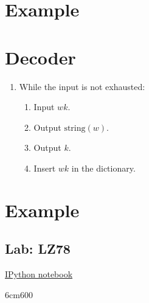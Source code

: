 \section{Example}
\section{Decoder}

\begin{enumerate}
\tightlist
\item
  While the input is not exhausted:
  \begin{enumerate}
  \tightlist
  \item
    Input \(wk\).
  \item
    Output \(\text{string}(w)\).
  \item
    Output \(k\).
  \item
    Insert \(wk\) in the dictionary.
  \end{enumerate}
\end{enumerate}

\section{Example}

\subsection{Lab: LZ78}
\href{https://nbviewer.jupyter.org/github/vicente-gonzalez-ruiz/LZ78/blob/master/LZ78.ipynb}{IPython notebook}

{6cm}{600}
